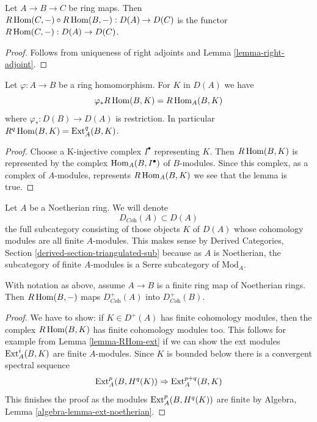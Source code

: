 \begin{lemma}
\label{lemma-composition-right-adjoints}
Let $A \to B \to C$ be ring maps. Then
$R\mathop{\mathrm{Hom}}\nolimits(C, -) \circ R\mathop{\mathrm{Hom}}\nolimits(B, -) : D(A) \to D(C)$
is the functor $R\mathop{\mathrm{Hom}}\nolimits(C, -) : D(A) \to D(C)$.
\end{lemma}

\begin{proof}
Follows from uniqueness of right adjoints and Lemma \ref{lemma-right-adjoint}.
\end{proof}

\begin{lemma}
\label{lemma-RHom-ext}
Let $\varphi : A \to B$ be a ring homomorphism. For $K$ in $D(A)$ we have
$$
\varphi_*R\mathop{\mathrm{Hom}}\nolimits(B, K) = R\mathop{\mathrm{Hom}}\nolimits_A(B, K)
$$
where $\varphi_* : D(B) \to D(A)$ is restriction. In particular
$R^q\mathop{\mathrm{Hom}}\nolimits(B, K) = \mathop{\mathrm{Ext}}\nolimits_A^q(B, K)$.
\end{lemma}

\begin{proof}
Choose a K-injective complex $I^\bullet$ representing $K$.
Then $R\mathop{\mathrm{Hom}}\nolimits(B, K)$ is represented by the complex $\mathop{\mathrm{Hom}}\nolimits_A(B, I^\bullet)$
of $B$-modules. Since this complex, as a complex of $A$-modules,
represents $R\mathop{\mathrm{Hom}}\nolimits_A(B, K)$ we see that the lemma is true.
\end{proof}

\noindent
Let $A$ be a Noetherian ring. We will denote
$$
D_{\textit{Coh}}(A) \subset D(A)
$$
the full subcategory consisting of those objects $K$ of $D(A)$
whose cohomology modules are all finite $A$-modules. This makes sense
by Derived Categories, Section \ref{derived-section-triangulated-sub}
because as $A$ is Noetherian, the subcategory of finite $A$-modules
is a Serre subcategory of $\text{Mod}_A$.

\begin{lemma}
\label{lemma-exact-support-coherent}
With notation as above, assume $A \to B$ is a finite ring map of
Noetherian rings. Then $R\mathop{\mathrm{Hom}}\nolimits(B, -)$ maps
$D^+_{\textit{Coh}}(A)$ into $D^+_{\textit{Coh}}(B)$.
\end{lemma}

\begin{proof}
We have to show: if $K \in D^+(A)$ has finite cohomology modules, then the
complex $R\mathop{\mathrm{Hom}}\nolimits(B, K)$ has finite cohomology modules too.
This follows for example from Lemma \ref{lemma-RHom-ext}
if we can show the ext modules $\mathop{\mathrm{Ext}}\nolimits^i_A(B, K)$
are finite $A$-modules. Since $K$ is bounded below there is a
convergent spectral sequence
$$
\mathop{\mathrm{Ext}}\nolimits^p_A(B, H^q(K)) \Rightarrow \text{Ext}^{p + q}_A(B, K)
$$
This finishes the proof as the modules $\mathop{\mathrm{Ext}}\nolimits^p_A(B, H^q(K))$
are finite by
Algebra, Lemma \ref{algebra-lemma-ext-noetherian}.
\end{proof}

